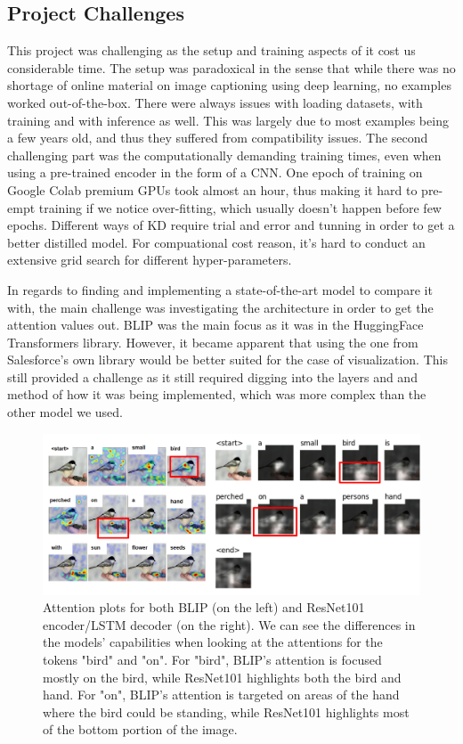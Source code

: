 \documentclass[10pt,twocolumn,letterpaper]{article}
\begin{document}
\subsection{Project Challenges}
This project was challenging as the setup and training aspects of it cost us considerable time. The setup was paradoxical in the sense that while there was no shortage of online material on image captioning using deep learning, no examples worked out-of-the-box. There were always issues with loading datasets, with training and with inference as well. This was largely due to most examples being a few years old, and thus they suffered from compatibility issues. The second challenging part was the computationally demanding training times, even when using a pre-trained encoder in the form of a CNN. One epoch of training on Google Colab premium GPUs took almost an hour, thus making it hard to pre-empt training if we notice over-fitting, which usually doesn't happen before few epochs. Different ways of KD require trial and error and tunning in order to get a better distilled model. For compuational cost reason, it's hard to conduct an extensive grid search for different hyper-parameters.

In regards to finding and implementing a state-of-the-art model to compare it with, the main challenge was investigating the architecture in order to get the attention values out.  BLIP was the main focus as it was in the HuggingFace Transformers library.  However, it became apparent that using the one from Salesforce's own library would be better suited for the case of visualization.  This still provided a challenge as it still required digging into the layers and and method of how it was being implemented, which was more complex than the other model we used.

\begin{figure}
\centering
   \includegraphics[width=1.1\linewidth]{../paper/images/bird_attention_comparison.png}
   \caption{Attention plots for both BLIP (on the left) and ResNet101 encoder/LSTM decoder (on the right).  We can see the differences in the models' capabilities when looking at the attentions for the tokens "bird" and "on". For "bird", BLIP's attention is focused mostly on the bird, while ResNet101 highlights both the bird and hand. For "on", BLIP's attention is targeted on areas of the hand where the bird could be standing, while ResNet101 highlights most of the bottom portion of the image.}
\label{fig:BLIP}
\end{figure}
\end{document}
